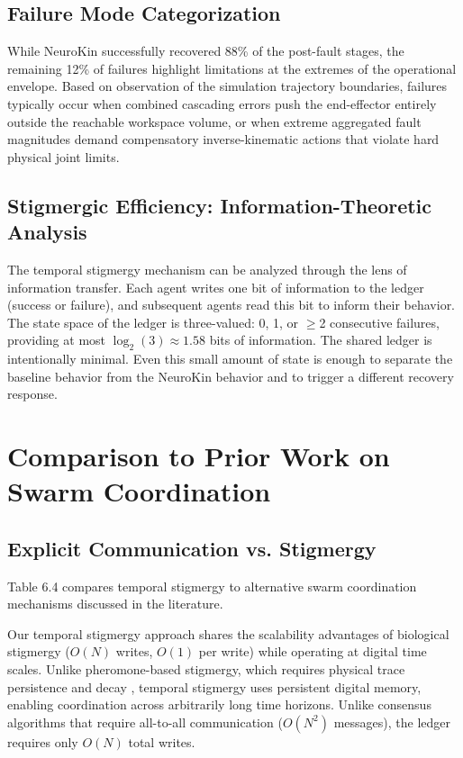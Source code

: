 \documentclass[12pt,a4paper,oneside]{report}
\begin{document}
\subsection{Failure Mode Categorization}

While NeuroKin successfully recovered 88\% of the post-fault stages, the remaining 12\% of failures highlight limitations at the extremes of the operational envelope. Based on observation of the simulation trajectory boundaries, failures typically occur when combined cascading errors push the end-effector entirely outside the reachable workspace volume, or when extreme aggregated fault magnitudes demand compensatory inverse-kinematic actions that violate hard physical joint limits.

\subsection{Stigmergic Efficiency: Information-Theoretic Analysis}

The temporal stigmergy mechanism can be analyzed through the lens of information transfer. Each agent writes one bit of information to the ledger (success or failure), and subsequent agents read this bit to inform their behavior. The state space of the ledger is three-valued: 0, 1, or $\geq$2 consecutive failures, providing at most $\log_2(3) \approx 1.58$ bits of information. The shared ledger is intentionally minimal. Even this small amount of state is enough to separate the baseline behavior from the NeuroKin behavior and to trigger a different recovery response.

\section{Comparison to Prior Work on Swarm Coordination}

\subsection{Explicit Communication vs. Stigmergy}

Table 6.4 compares temporal stigmergy to alternative swarm coordination mechanisms discussed in the literature.

Our temporal stigmergy approach shares the scalability advantages of biological stigmergy ($O(N)$ writes, $O(1)$ per write) while operating at digital time scales. Unlike pheromone-based stigmergy, which requires physical trace persistence and decay \cite{bongard2006resilient}, temporal stigmergy uses persistent digital memory, enabling coordination across arbitrarily long time horizons. Unlike consensus algorithms that require all-to-all communication ($O(N^2)$ messages), the ledger requires only $O(N)$ total writes.
\end{document}

